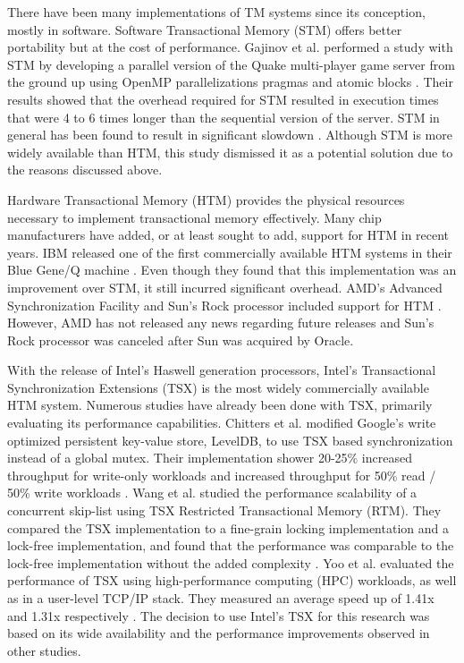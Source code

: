 \documentclass[11pt]{book}
\begin{document}
There have been many implementations of TM systems since its conception, mostly in
software.  Software Transactional Memory (STM) offers better portability but at the cost
of performance.  Gajinov et al. performed a study with STM by developing a parallel
version of the Quake multi-player game server from the ground up using OpenMP
parallelizations pragmas and atomic blocks \cite{quake_stm}.  Their results showed that
the overhead required for STM resulted in execution times that were 4 to 6 times longer
than the sequential version of the server.  STM in general has been found to result in
significant slowdown \cite{stm_cascaval}.  Although STM is more widely available than HTM,
this study dismissed it as a potential solution due to the reasons discussed above.

Hardware Transactional Memory (HTM) provides the physical resources necessary to implement
transactional memory effectively.  Many chip manufacturers have added, or at least sought
to add, support for HTM in recent years.  IBM released one of the first commercially
available HTM systems in their Blue Gene/Q machine \cite{blue_wang}.  Even though they
found that this implementation was an improvement over STM, it still incurred significant
overhead.  AMD's Advanced Synchronization Facility and Sun's Rock processor included
support for HTM \cite{chung_amd,rock_dice}.  However, AMD has not released any news
regarding future releases and Sun's Rock processor was canceled after Sun was acquired by
Oracle.

With the release of Intel's Haswell generation processors, Intel's Transactional
Synchronization Extensions (TSX) is the most widely commercially available HTM system.
Numerous studies have already been done with TSX, primarily evaluating its performance
capabilities.  Chitters et al. modified Google's write optimized persistent key-value
store, LevelDB, to use TSX based synchronization instead of a global mutex.  Their
implementation shower 20-25\% increased throughput for write-only workloads and increased
throughput for 50\% read / 50\% write workloads \cite{chitters_tsx}.  Wang et al. studied
the performance scalability of a concurrent skip-list using TSX Restricted Transactional
Memory (RTM).  They compared the TSX implementation to a fine-grain locking implementation
and a lock-free implementation, and found that the performance was comparable to the
lock-free implementation without the added complexity \cite{wang_tsx}.  Yoo et
al. evaluated the performance of TSX using high-performance computing (HPC) workloads, as
well as in a user-level TCP/IP stack.  They measured an average speed up of 1.41x and
1.31x respectively \cite{yoo_tsx}.  The decision to use Intel's TSX for this research was
based on its wide availability and the performance improvements observed in other studies.
\end{document}

